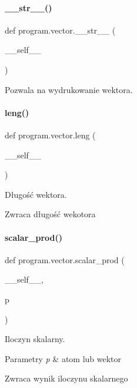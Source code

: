 \paragraph{\+\_\+\+\_\+str\+\_\+\+\_\+()}
{\footnotesize\ttfamily def program.\+vector.\+\_\+\+\_\+str\+\_\+\+\_\+ (\begin{DoxyParamCaption}\item[{}]{\+\_\+\+\_\+self\+\_\+\+\_\+ }\end{DoxyParamCaption})}



Pozwala na wydrukowanie wektora. 

\mbox{\label{classprogram_1_1vector_a54f0045e9d22ffb4d977ab44e28a18cf}} 
\paragraph{leng()}
{\footnotesize\ttfamily def program.\+vector.\+leng (\begin{DoxyParamCaption}\item[{}]{\+\_\+\+\_\+self\+\_\+\+\_\+ }\end{DoxyParamCaption})}



Długość wektora. 

\begin{DoxyReturn}{Zwraca}
długość wekotora 
\end{DoxyReturn}
\mbox{\label{classprogram_1_1vector_a0dc5c2b9fbc2274a5cb2df6959e64ba9}} 
\paragraph{scalar\+\_\+prod()}
{\footnotesize\ttfamily def program.\+vector.\+scalar\+\_\+prod (\begin{DoxyParamCaption}\item[{}]{\+\_\+\+\_\+self\+\_\+\+\_\+,  }\item[{}]{p }\end{DoxyParamCaption})}



Iloczyn skalarny. 


\begin{DoxyParams}{Parametry}
{\em p} & atom lub wektor \\
\hline
\end{DoxyParams}
\begin{DoxyReturn}{Zwraca}
wynik iloczynu skalarnego 
\end{DoxyReturn}
\mbox{\label{classprogram_1_1vector_a96e4f8b560b286ddd5a7ae26d76adbd5}} 
